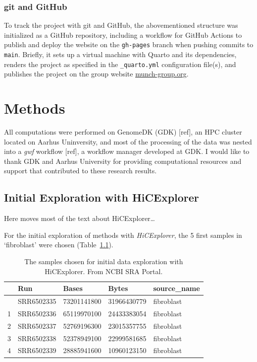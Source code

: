 \documentclass[
  11pt,
  a4paper,
]{scrbook}
\let\oldemph\emph
\renewcommand\emph[1]{\oldemph{\color{gray}#1}}
\begin{document}
\subsection{git and GitHub}\label{git-and-github}

To track the project with git and GitHub, the abovementioned structure
was initialized as a GitHub repository, including a workflow for GitHub
Actions to publish and deploy the website on the \texttt{gh-pages}
branch when pushing commits to \texttt{main}. Briefly, it sets up a
virtual machine with Quarto and its dependencies, renders the project as
specified in the \texttt{\_quarto.yml} configuration file(s), and
publishes the project on the group website
\href{https://munch-group.org/hic-spermatogenesis}{munch-group.org}.

\chapter{Methods}\label{methods}

All computations were performed on GenomeDK (GDK) {[}ref{]}, an HPC
cluster located on Aarhus Uninversity, and most of the processing of the
data was nested into a \emph{gwf} workflow {[}ref{]}, a workflow manager
developed at GDK. I would like to thank GDK and Aarhus University for
providing computational resources and support that contributed to these
research results.

\section{Initial Exploration with
HiCExplorer}\label{initial-exploration-with-hicexplorer}

Here moves most of the text about HiCExplorer\ldots{}

For the initial exploration of methods with \emph{HiCExplorer}, the 5
first samples in `fibroblast' were chosen
(Table~\ref{tbl-hic-exploration}).

\small

\begin{longtable}[]{@{}lllll@{}}

\caption{\label{tbl-hic-exploration}The samples chosen for initial data
exploration with HiCExplorer. From NCBI SRA Portal.}

\tabularnewline

\toprule\noalign{}
& Run & Bases & Bytes & source\_name \\
\midrule\noalign{}
\endhead
\bottomrule\noalign{}
\endlastfoot
0 & SRR6502335 & 73201141800 & 31966430779 & fibroblast \\
1 & SRR6502336 & 65119970100 & 24433383054 & fibroblast \\
2 & SRR6502337 & 52769196300 & 23015357755 & fibroblast \\
3 & SRR6502338 & 52378949100 & 22999581685 & fibroblast \\
4 & SRR6502339 & 28885941600 & 10960123150 & fibroblast \\

\end{longtable}
\end{document}
